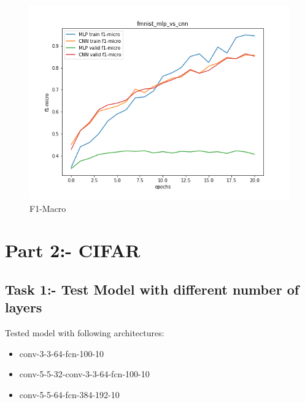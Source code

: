 \documentclass{article}
\begin{document}
\begin{figure}[!htb]
	\includegraphics[width=\linewidth]{../output_plots/FMNIST/task-7/fmnist-mlp-vs-cnn-F1-Micro-score-f1-micro.png}
	\caption{F1-Macro}\label{fig:part_1_task_7_f1-macro}
	\endminipage
\end{figure}

\pagebreak
\section{Part 2:- CIFAR}
\subsection{Task 1:- Test Model with different number of layers}
Tested model with following architectures:
\begin{itemize}
	\item conv-3-3-64-fcn-100-10
	\item conv-5-5-32-conv-3-3-64-fcn-100-10
	\item conv-5-5-64-fcn-384-192-10
\end{itemize}
\end{document}

